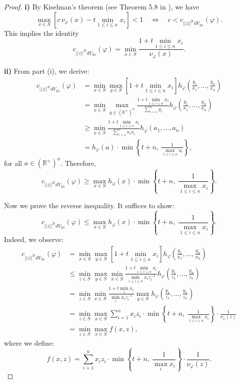 \documentclass[a4paper,oneside,reqno,11pt]{article}
\begin{document}
\begin{proof}
	\textbf{i)} By Kiselman's theorem (see Theorem 5.8 in \cite{Ki94}), we have
	$$
	\max_{x \in S} \left[ c\, \nu_{\varphi}(x) - t \min_{1 \leq i \leq n} x_i \right] < 1
	\quad \Longleftrightarrow \quad c < c_{ ||z||^{2t} dV_{2n} } (\varphi).
	$$
	This implies the identity
	$$
	c_{ ||z||^{2t} dV_{2n} } (\varphi) = \min_{x \in S} \frac{1 + t \min_{1 \leq i \leq n} x_i}{\nu_{\varphi}(x)}.
	$$
	
	\textbf{ii)} From part (i), we derive:
	$$
	\begin{aligned}
		c_{ ||z||^{2t} dV_{2n} } (\varphi)
		&= \min_{x \in S} \max_{y \in S} \left[1 + t \min_{1 \leq i \leq n} x_i\right] 
		h_{\varphi} \left( \frac{y_1}{x_1}, \ldots, \frac{y_n}{x_n} \right) \\
		&= \min_{x \in S} \max_{y \in (\mathbb{R}^+)^n} \frac{1 + t \min_{1 \leq i \leq n} x_i}{\sum_{i=1}^n y_i}
		h_{\varphi} \left( \frac{y_1}{x_1}, \ldots, \frac{y_n}{x_n} \right) \\
		&\geq \min_{x \in S} \frac{1 + t \min_{1 \leq i \leq n} x_i}{\sum_{i=1}^n a_i x_i} h_{\varphi}(a_1, \ldots, a_n) \\
		&= h_{\varphi}(a) \cdot \min \left\{ t+n,\ \frac{1}{\max_{1 \leq i \leq n} a_i} \right\},
	\end{aligned}
	$$
	for all $ a \in (\mathbb{R}^+)^n $. Therefore,
	$$
	c_{ ||z||^{2t} dV_{2n} } (\varphi) \geq \max_{x \in S} h_{\varphi}(x) \cdot \min \left\{ t+n,\ \frac{1}{\max_{1 \leq i \leq n} x_i} \right\}.
	$$
	
	Now we prove the reverse inequality. It suffices to show:
	$$
	c_{ ||z||^{2t} dV_{2n} } (\varphi) \leq \max_{x \in S} h_{\varphi}(x) \cdot \min \left\{ t+n,\ \frac{1}{\max_{1 \leq i \leq n} x_i} \right\}.
	$$
	Indeed, we observe:
	$$
	\begin{aligned}
		c_{ ||z||^{2t} dV_{2n} } (\varphi)
		&= \min_{x \in S} \max_{y \in S} \left[1 + t \min_{1 \leq i \leq n} x_i\right] 
		h_{\varphi} \left( \frac{y_1}{x_1}, \ldots, \frac{y_n}{x_n} \right) \\
		&\leq \min_{z \in S} \max_{y \in S} \min_{x \in S}
		\frac{1 + t \min_{1 \leq i \leq n} x_i}{\min_{1 \leq i \leq n} x_i z_i^{-1}} 
		h_{\varphi} \left( \frac{y_1}{z_1}, \ldots, \frac{y_n}{z_n} \right) \\
		&= \min_{z \in S} \min_{x \in S} \frac{1 + t \min_{i} x_i}{\min_{i} x_i z_i^{-1}} 
		\max_{y \in S} h_{\varphi} \left( \frac{y_1}{z_1}, \ldots, \frac{y_n}{z_n} \right) \\
		&= \min_{z \in S} \max_{x \in S} \sum_{i=1}^n x_i z_i 
		\cdot \min \left\{ t+n,\ \frac{1}{\max_{1 \leq i \leq n} x_i} \right\} \cdot \frac{1}{\nu_{\varphi}(z)} \\
		&= \min_{z \in S} \max_{x \in S} f(x, z),
	\end{aligned}
	$$
	where we define:
	$$
	f(x, z) = \sum_{i=1}^n x_i z_i \cdot \min \left\{ t+n,\ \frac{1}{\max_i x_i} \right\} \cdot \frac{1}{\nu_{\varphi}(z)}.
	$$
	

\end{proof}
\end{document}

